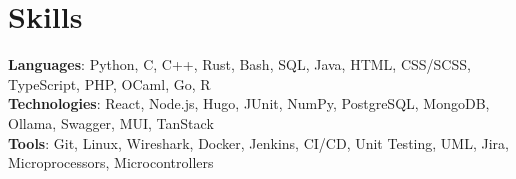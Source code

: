 \documentclass[letterpaper,11pt]{article}
\begin{document}
\section{Skills}
 \begin{itemize}[leftmargin=0.15in, label={}]
    \small{\item{
     \textbf{Languages}{: Python, C, C++, Rust, Bash, SQL, Java, HTML, CSS/SCSS, TypeScript, PHP, OCaml, Go, R} \\
     \textbf{Technologies}{: React, Node.js, Hugo, JUnit, NumPy, PostgreSQL, MongoDB, Ollama, Swagger, MUI, TanStack} \\
     \textbf{Tools}{: Git, Linux, Wireshark, Docker, Jenkins, CI/CD, Unit Testing, UML, Jira, Microprocessors, Microcontrollers}
    }}
 \end{itemize}

\end{document}
